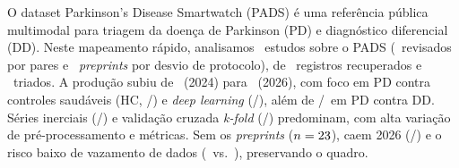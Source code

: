 \begin{abstract}
The Parkinson's Disease Smartwatch (PADS) dataset is a public multimodal
benchmark for Parkinson's disease (PD) screening and differential diagnosis
(DD). This rapid mapping study covers \nTotal\ PADS works (\nRevisadosPares\
peer-reviewed and \nPreprints\ preprints included as a declared protocol
deviation), from \nImportados\ retrieved and \nTriados\ screened records. Output
rose from \nAnoDoisQuatro\ (2024) to \nAnoDoisSeis\ (2026), centered on PD vs.\
healthy controls (HC, \nCenPDHC/\nTotal) and deep learning (\nFamDL/\nTotal),
with \nCenPDDD/\nTotal\ addressing PD vs.\ DD. Inertial series (\nModIMU/\nTotal)
and \textit{k-fold} cross-validation (\nValKfold/\nTotal) dominate, while
preprocessing and metrics vary widely. Excluding preprints ($n=\nRevisadosPares$)
lowers 2026 output (\nRevAnoDoisSeis/\nRevisadosPares) and low data leakage risk
(\pctRevRiscoBaixoAplic\ vs.\ \pctRiscoBaixoAplic), while qualitative patterns
hold.
\end{abstract}

\begin{resumo}
O dataset Parkinson's Disease Smartwatch (PADS) é uma referência pública
multimodal para triagem da doença de Parkinson (PD) e diagnóstico diferencial
(DD). Neste mapeamento rápido, analisamos \nTotal\ estudos sobre o PADS
(\nRevisadosPares\ revisados por pares e \nPreprints\ \textit{preprints} por
desvio de protocolo), de \nImportados\ registros recuperados e \nTriados\
triados. A produção subiu de \nAnoDoisQuatro\ (2024) para \nAnoDoisSeis\
(2026), com foco em PD contra controles saudáveis (HC, \nCenPDHC/\nTotal) e
\textit{deep learning} (\nFamDL/\nTotal), além de \nCenPDDD/\nTotal\ em PD
contra DD. Séries inerciais (\nModIMU/\nTotal) e validação cruzada
\textit{k-fold} (\nValKfold/\nTotal) predominam, com alta variação de
pré-processamento e métricas. Sem os \textit{preprints} ($n=\nRevisadosPares$),
caem 2026 (\nRevAnoDoisSeis/\nRevisadosPares) e o risco baixo de vazamento de
dados (\pctRevRiscoBaixoAplic\ vs.\ \pctRiscoBaixoAplic), preservando o quadro.
\end{resumo}
